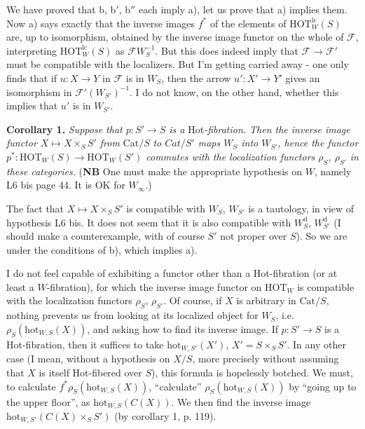 \documentclass[11pt]{article}
\newcommand{\msp}[1]{\marginpar{\footnotesize [#1]}}
\newcommand{\HOT}{\mathrm{HOT}}
\newcommand{\hot}{\mathrm{hot}}
\newcommand{\Cat}{\mathrm{Cat}}
\begin{document}
We have proved that b, b$'$, b$''$ each imply a), let us prove that a) implies them. Now a) says exactly that the inverse images $f^*$ of the elements of $\HOT_W^{\mathrm{lc}}(S)$
\msp{page 126}
are, up to isomorphism, obtained by the inverse image functor on the whole of $\mathcal{F}$, interpreting $\HOT_W^{\mathrm{lc}}(S)$ as $\mathcal{F}W_S^{-1}$. But this does indeed imply that $\mathcal{F} \longrightarrow \mathcal{F}'$ must be compatible with the localizers. But I'm getting carried away - one only finds that if $u : X \longrightarrow Y$ in $\mathcal{F}$ is in $W_S$, then the arrow $u' : X' \longrightarrow Y'$ gives an isomorphism in $\mathcal{F}'(W_{S'})^{-1}$. I do not know, on the other hand, whether this implies that $u'$ is in $W_{S'}$.

\textbf{Corollary 1.} \textit{Suppose that $p : S' \longrightarrow S$ is a} Hot\textit{-fibration. Then the inverse image functor $X \longmapsto X \times_S S'$ from} $\Cat/S$ \textit{to $\mathit{Cat}/S'$ maps $W_S$ into $W_{S'}$, hence the functor $p^* : \HOT_W(S) \longrightarrow \HOT_W(S')$ commutes with the localization functors $\rho_S$, $\rho_{S'}$ in these categories.} (\textbf{NB} One must make the appropriate hypothesis on $W$, namely L6 bis page 44. It is OK for $W_\infty$.)

The fact that $X \longmapsto X \times_S S'$ is compatible with $W_S$, $W_{S'}$ is a tautology, in view of hypothesis L6 bis. It does not seem that it is also compatible with $W_S^{\mathrm{d}}$, $W_{S'}^{\mathrm{d}}$ (I should make a counterexample, with of course $S'$ not proper over $S$). So we are under the conditions of b), which implies a).

\msp{page 127}

I do not feel capable of exhibiting a functor other than a Hot-fibration (or at least a $W$-fibration), for which the inverse image functor on $\HOT_W$ is compatible with the localization functors $\rho_S$, $\rho_{S'}$. Of course, if $X$ is arbitrary in $\Cat/S$, nothing prevents us from looking at its localized object for $W_S$, i.e. $\rho_S(\hot_{W,S}(X))$, and asking how to find its inverse image. If $p : S' \longrightarrow S$ is a Hot-fibration, then it suffices to take $\hot_{W,S'}(X')$, $X' = S \times_S S'$. In any other case (I mean, without a hypothesis on $X/S$, more %
precisely without assuming that $X$ is itself Hot-fibered over $S$), this formula is hopelessly botched. We must, to calculate $f^*\rho_S(\hot_{W,S}(X))$, ``calculate'' $\rho_S(\hot_{W,S}(X))$ by ``going up to the upper floor'', as $\hot_{W,S}(C(X))$. We then find the inverse image $\hot_{W,S'}(C(X) \times_S S')$ (by corollary 1, p. 119).
\end{document}
